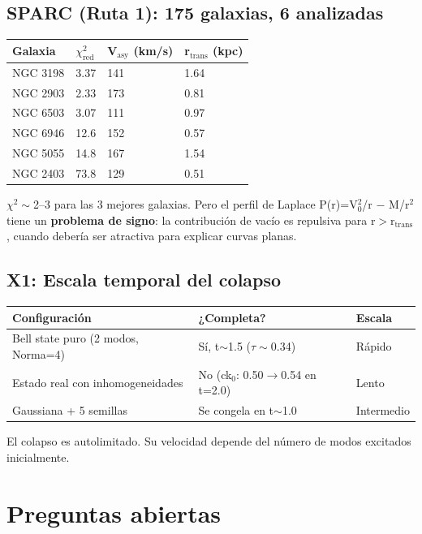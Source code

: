 \documentclass[12pt]{article}
\begin{document}
\subsection{SPARC (Ruta 1): 175 galaxias, 6 analizadas}

\begin{tabular}{llll}
\toprule
Galaxia & $\chi^2_{\text{red}}$ & V$_{\text{asy}}$ (km/s) & r$_{\text{trans}}$ (kpc) \\
\midrule
NGC 3198 & 3.37 & 141 & 1.64 \\
NGC 2903 & 2.33 & 173 & 0.81 \\
NGC 6503 & 3.07 & 111 & 0.97 \\
NGC 6946 & 12.6 & 152 & 0.57 \\
NGC 5055 & 14.8 & 167 & 1.54 \\
NGC 2403 & 73.8 & 129 & 0.51 \\
\bottomrule
\end{tabular}

$\chi^2\sim$2--3 para las 3 mejores galaxias. Pero el perfil de Laplace P(r)=V$_0^2$/r $-$ M/r$^2$ tiene un \textbf{problema de signo}: la contribución de vacío es repulsiva para r$>$r$_{\text{trans}}$, cuando debería ser atractiva para explicar curvas planas.

\subsection{X1: Escala temporal del colapso}

\begin{tabular}{lll}
\toprule
Configuración & ¿Completa? & Escala \\
\midrule
Bell state puro (2 modos, Norma=4) & Sí, t$\sim$1.5 ($\tau\sim$0.34) & Rápido \\
Estado real con inhomogeneidades & No (ck$_0$: 0.50$\to$0.54 en t=2.0) & Lento \\
Gaussiana + 5 semillas & Se congela en t$\sim$1.0 & Intermedio \\
\bottomrule
\end{tabular}

El colapso es autolimitado. Su velocidad depende del número de modos excitados inicialmente.

\section{Preguntas abiertas}
\end{document}
